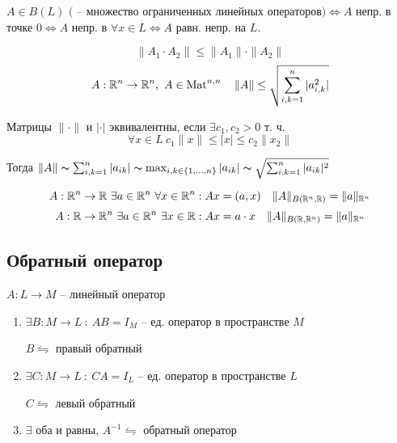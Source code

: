     \begin{proposition}
        $A \in B(L) \text{ ( -- множество ограниченных линейных операторов)} \Leftrightarrow A$ непр. в точке $0 \Leftrightarrow A$ непр. в $\forall x \in L \Leftrightarrow A$ равн. непр. на $L$.
    \end{proposition}

    \begin{remark}
        \[
            \| A_1 \cdot A_2 \| \le \| A_1 \| \cdot \| A_2 \|   
        \]
        \[
            A : \mathbb{R}^n \rightarrow \mathbb{R}^n, \ A \in \operatorname{Mat}^{n, n} \quad \| A \| \leq \sqrt{\sum_{i, k = 1}^n |a_{i, k}^2|}
        \]
    \end{remark}

    \begin{definition}
        Матрицы $\|\cdot\|$ и $|\cdot|$ эквивалентны, если $\exists c_1, c_2 > 0$ т. ч.
        \[
            \forall x \in L \ c_1 \|x\| \le |x| \le c_2 \|x_2\|
        \]
        \par Тогда $\| A \| \thicksim \sum_{i, k = 1}^n |a_{ik}| \thicksim \max_{i, k \in \{1, \dots, n\}} |a_{ik}| \thicksim \sqrt{\sum_{i, k = 1}^n |a_{ik}|^2}$
    \end{definition}

    \begin{remark}
        \[
            A : \R^n  \rightarrow \R \ \exists a \in \R^n \ \forall x \in \R^n : Ax = (a, x) \quad \| A \|_{B(\R^n, \R)} = \| a \|_{\R^n}  %
        \]
        \[
            A : \mathbb{R} \rightarrow \mathbb{R}^n \ \exists a \in \mathbb{R}^n \ \exists x \in \mathbb{R} : Ax = a \cdot x \quad \| A \|_{B(\mathbb{R}, \mathbb{R}^n)} = \| a \|_{\mathbb{R}^n}  
        \]
    \end{remark}

    \subsection*{Обратный оператор}
    
    $A : L \rightarrow M$ -- линейный оператор

    \begin{enumerate}
        \item $\exists B : M \rightarrow L \ : \ AB = I_M$ -- ед. оператор в пространстве $M$
        \par $B \leftrightharpoons$ правый обратный
        \item $\exists C : M \rightarrow L \ : \ CA = I_L$ -- ед. оператор в пространстве $L$
        \par $C \leftrightharpoons$ левый обратный
        \item $\exists$ оба и равны, $A^{-1} \leftrightharpoons$ обратный оператор
    \end{enumerate}

